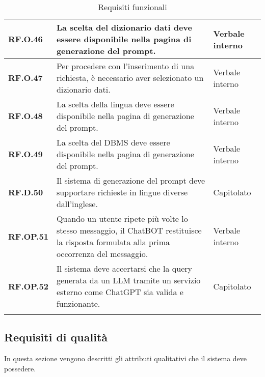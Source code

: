 \begin{longtable}{|P{3cm}|P{6,5cm}|>{\arraybackslash}P{4cm}|}
    \hline
    \textbf{RF.O.46} & La scelta del dizionario dati deve essere disponibile nella pagina di generazione del prompt. & Verbale interno \\
    \hline
    \textbf{RF.O.47} & Per procedere con l'inserimento di una richiesta, è necessario aver selezionato un dizionario dati. & Verbale interno \\
    \hline
    \textbf{RF.O.48} & La scelta della lingua deve essere disponibile nella pagina di generazione del prompt. & Verbale interno \\
    \hline
    \textbf{RF.O.49} & La scelta del DBMS deve essere disponibile nella pagina di generazione del prompt. & Verbale interno \\
    \hline
    \textbf{RF.D.50} & Il sistema di generazione del prompt deve supportare richieste in lingue diverse dall'inglese. & Capitolato \\
    \hline
    \textbf{RF.OP.51} & Quando un utente ripete più volte lo stesso messaggio, il ChatBOT restituisce la risposta formulata alla prima occorrenza del messaggio. & Verbale interno \\
    \hline
    \textbf{RF.OP.52} & Il sistema deve accertarsi che la query  generata da un LLM tramite un servizio esterno come ChatGPT sia valida e funzionante. & Capitolato \\
    \hline
\caption{Requisiti funzionali}
\label{requisitifunzionali}
\end{longtable}

\subsection{Requisiti di qualità}
\par In questa sezione vengono descritti gli attributi qualitativi che il sistema deve possedere.

